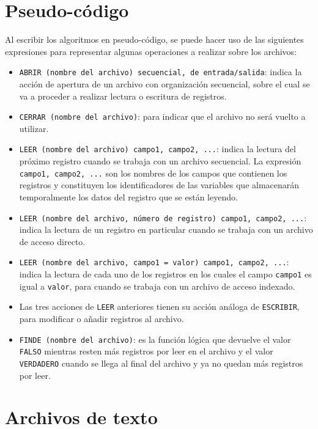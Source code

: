 \documentclass[]{book}
\providecommand{\tightlist}{%
  \setlength{\itemsep}{0pt}\setlength{\parskip}{0pt}}
\begin{document}
\hypertarget{pseudo-codigo}{%
\section{Pseudo-código}\label{pseudo-codigo}}

Al escribir los algoritmos en pseudo-código, se puede hacer uso de las siguientes expresiones para representar algunas operaciones a realizar sobre los archivos:

\begin{itemize}
\tightlist
\item
  \texttt{ABRIR\ (nombre\ del\ archivo)\ secuencial,\ de\ entrada/salida}: indica la acción de apertura de un archivo con organización secuencial, sobre el cual se va a proceder a realizar lectura o escritura de registros.
\item
  \texttt{CERRAR\ (nombre\ del\ archivo)}: para indicar que el archivo no será vuelto a utilizar.
\item
  \texttt{LEER\ (nombre\ del\ archivo)\ campo1,\ campo2,\ ...}: indica la lectura del próximo registro cuando se trabaja con un archivo secuencial. La expresión \texttt{campo1,\ campo2,\ ...} son los nombres de los campos que contienen los registros y constituyen los identificadores de las variables que almacenarán temporalmente los datos del registro que se están leyendo.
\item
  \texttt{LEER\ (nombre\ del\ archivo,\ número\ de\ registro)\ campo1,\ campo2,\ ...}: indica la lectura de un registro en particular cuando se trabaja con un archivo de acceso directo.
\item
  \texttt{LEER\ (nombre\ del\ archivo,\ campo1\ =\ valor)\ campo1,\ campo2,\ ...}: indica la lectura de cada uno de los registros en los cuales el campo \texttt{campo1} es igual a \texttt{valor}, para cuando se trabaja con un archivo de acceso indexado.
\item
  Las tres acciones de \texttt{LEER} anteriores tienen su acción análoga de \texttt{ESCRIBIR}, para modificar o añadir registros al archivo.
\item
  \texttt{FINDE\ (nombre\ del\ archivo)}: es la función lógica que devuelve el valor \texttt{FALSO} mientras resten más registros por leer en el archivo y el valor \texttt{VERDADERO} cuando se llega al final del archivo y ya no quedan más registros por leer.
\end{itemize}

\hypertarget{archivos-de-texto}{%
\section{Archivos de texto}\label{archivos-de-texto}}
\end{document}
